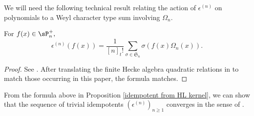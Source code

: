 We will need the following technical result relating the action of $\epsilon^{(n)}$ on polynomials to a Weyl character type sum involving $\Omega_n$.

\begin{prop}\label{idempotent from HL kernel}
    For $f(x) \in \sP_n^{+},$ 
    \begin{equation}
        \epsilon^{(n)}(f(x)) = \frac{1}{[n]_{t}!} \sum_{\sigma \in \mathfrak{S}_n} \sigma( f(x)\Omega_n(x) ).
    \end{equation}
\end{prop}
\begin{proof}
   See \cite[Remark 4.17]{ram2006alcove}. After translating the finite Hecke algebra quadratic relations in \cite{ram2006alcove} to match those occurring in this paper, the formula matches.
\end{proof}

From the formula above in Proposition \ref{idempotent from HL kernel}, we can show that the sequence of trivial idempotents $(\epsilon^{(n)})_{n\geq 1}$ converges in the sense of \cite{Ion_2022}. 

